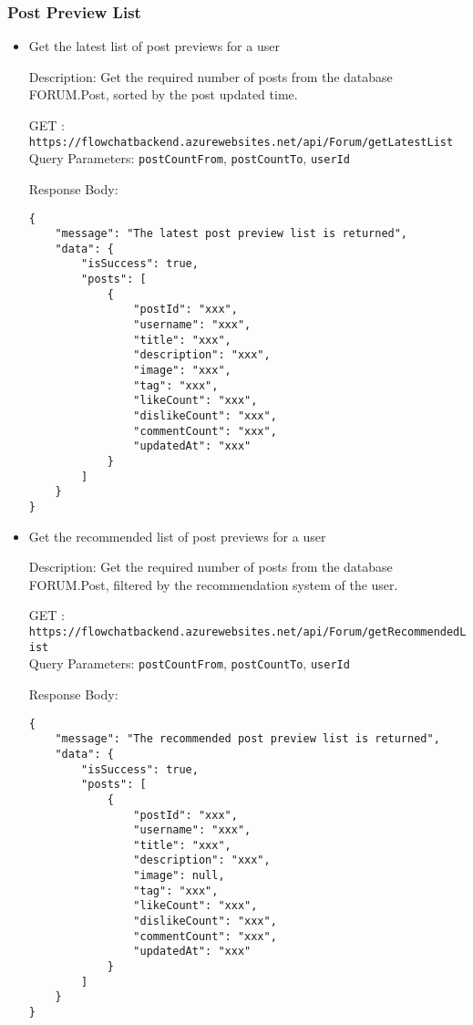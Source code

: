 \documentclass[11pt, a4paper]{article}
\begin{document}
\subsubsection{Post Preview List}
\begin{itemize}
\item Get the latest list of post previews for a user

Description: Get the required number of posts from the database FORUM.Post, sorted by the post updated time. 

GET :  \texttt{https://flowchatbackend.azurewebsites.net/api/Forum/getLatestList}\\
Query Parameters: \verb|postCountFrom|, \verb|postCountTo|, \verb|userId|
    
Response Body:
    \begin{lstlisting}[breaklines=true, frame=single]
{
    "message": "The latest post preview list is returned",
    "data": {
        "isSuccess": true,
        "posts": [
            {
                "postId": "xxx",
                "username": "xxx",
                "title": "xxx",
                "description": "xxx",
                "image": "xxx",
                "tag": "xxx",
                "likeCount": "xxx",
                "dislikeCount": "xxx",
                "commentCount": "xxx",
                "updatedAt": "xxx"
            }
        ]
    }
}
    \end{lstlisting}

\item Get the recommended list of post previews for a user

Description: Get the required number of posts from the database FORUM.Post, filtered by the recommendation system of the user. 

GET :  \texttt{https://flowchatbackend.azurewebsites.net/api/Forum/getRecommendedList}\\
Query Parameters: \verb|postCountFrom|, \verb|postCountTo|, \verb|userId|
    
Response Body:
    \begin{lstlisting}[breaklines=true, frame=single]
{
    "message": "The recommended post preview list is returned",
    "data": {
        "isSuccess": true,
        "posts": [
            {
                "postId": "xxx",
                "username": "xxx",
                "title": "xxx",
                "description": "xxx",
                "image": null,
                "tag": "xxx",
                "likeCount": "xxx",
                "dislikeCount": "xxx",
                "commentCount": "xxx",
                "updatedAt": "xxx"
            }
        ]
    }
}
    \end{lstlisting}


\end{itemize}
\end{document}
